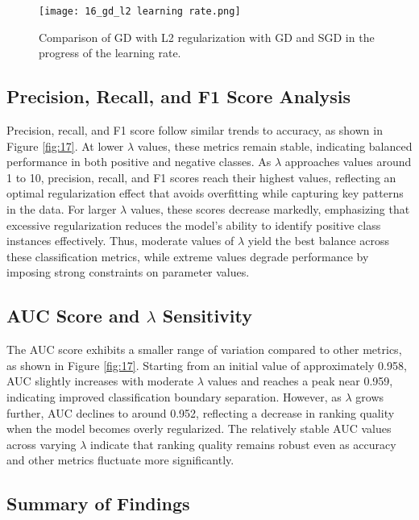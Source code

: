 \documentclass[a4paper,oneside,bibliography=totoc]{scrartcl}
\begin{document}
\begin{figure}[H]
    \centering
    \texttt{[image: 16\_gd\_l2 learning rate.png]}
    \caption{Comparison of GD with L2 regularization with GD and SGD in the progress of the learning rate.}
    \label{fig:16}
\end{figure}


\subsection{Precision, Recall, and F1 Score Analysis}
\label{section4p}

Precision, recall, and F1 score follow similar trends to accuracy, as shown in Figure \ref{fig:17}. At lower $\lambda$ values, these metrics remain stable, indicating balanced performance in both positive and negative classes. As $\lambda$ approaches values around 1 to 10, precision, recall, and F1 scores reach their highest values, reflecting an optimal regularization effect that avoids overfitting while capturing key patterns in the data. For larger $\lambda$ values, these scores decrease markedly, emphasizing that excessive regularization reduces the model’s ability to identify positive class instances effectively. Thus, moderate values of $\lambda$ yield the best balance across these classification metrics, while extreme values degrade performance by imposing strong constraints on parameter values.

\subsection{AUC Score and $\lambda$ Sensitivity}

The AUC score exhibits a smaller range of variation compared to other metrics, as shown in Figure \ref{fig:17}. Starting from an initial value of approximately 0.958, AUC slightly increases with moderate $\lambda$ values and reaches a peak near 0.959, indicating improved classification boundary separation. However, as $\lambda$ grows further, AUC declines to around 0.952, reflecting a decrease in ranking quality when the model becomes overly regularized. The relatively stable AUC values across varying $\lambda$ indicate that ranking quality remains robust even as accuracy and other metrics fluctuate more significantly.

\subsection{Summary of Findings}
\end{document}
